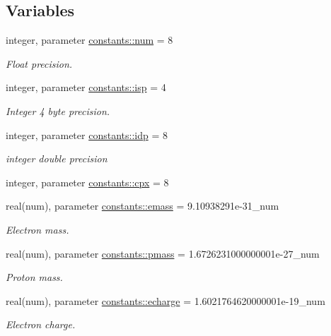 \subsection*{Variables}
\begin{DoxyCompactItemize}
\item 
integer, parameter \hyperlink{namespaceconstants_afe19f7f8af171411c51fb763b36e3823}{constants\+::num} = 8
\begin{DoxyCompactList}\small\item\em Float precision. \end{DoxyCompactList}\item 
integer, parameter \hyperlink{namespaceconstants_a5a2ae450a00d2a29f9b70dcb776f7a2f}{constants\+::isp} = 4
\begin{DoxyCompactList}\small\item\em Integer 4 byte precision. \end{DoxyCompactList}\item 
integer, parameter \hyperlink{namespaceconstants_ae345db51770e3628e6aaf76e6a45e160}{constants\+::idp} = 8
\begin{DoxyCompactList}\small\item\em integer double precision \end{DoxyCompactList}\item 
integer, parameter \hyperlink{namespaceconstants_a5709f0ae2ee52b1906446ad25ed0f587}{constants\+::cpx} = 8
\item 
real(num), parameter \hyperlink{namespaceconstants_ad39536f583f0861abb2fb19a27c56fc8}{constants\+::emass} = 9.\+10938291e-\/31\+\_\+num
\begin{DoxyCompactList}\small\item\em Electron mass. \end{DoxyCompactList}\item 
real(num), parameter \hyperlink{namespaceconstants_a44f3d8cbf9c39db63d7533d985cc51c3}{constants\+::pmass} = 1.\+6726231000000001e-\/27\+\_\+num
\begin{DoxyCompactList}\small\item\em Proton mass. \end{DoxyCompactList}\item 
real(num), parameter \hyperlink{namespaceconstants_af0f1098f6be55eab4174890ed5caaf98}{constants\+::echarge} = 1.\+6021764620000001e-\/19\+\_\+num
\begin{DoxyCompactList}\small\item\em Electron charge. \end{DoxyCompactList}\item 

\end{DoxyCompactItemize}
